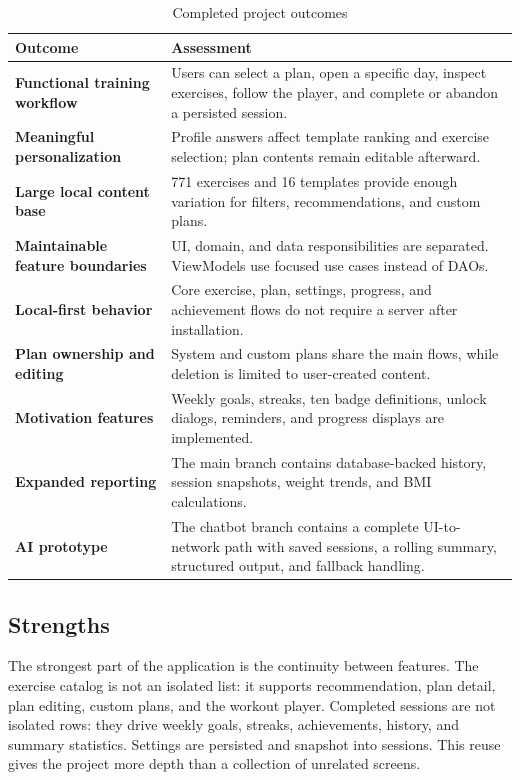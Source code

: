 \begin{table}[ht]
\centering
\caption{Completed project outcomes}
\label{tab:completed-outcomes}
\begin{tabularx}{\textwidth}{>{\bfseries}p{} X}
\toprule
Outcome & Assessment \\
\midrule
Functional training workflow & Users can select a plan, open a specific day, inspect exercises, follow the player, and complete or abandon a persisted session. \\
Meaningful personalization & Profile answers affect template ranking and exercise selection; plan contents remain editable afterward. \\
Large local content base & 771 exercises and 16 templates provide enough variation for filters, recommendations, and custom plans. \\
Maintainable feature boundaries & UI, domain, and data responsibilities are separated. ViewModels use focused use cases instead of DAOs. \\
Local-first behavior & Core exercise, plan, settings, progress, and achievement flows do not require a server after installation. \\
Plan ownership and editing & System and custom plans share the main flows, while deletion is limited to user-created content. \\
Motivation features & Weekly goals, streaks, ten badge definitions, unlock dialogs, reminders, and progress displays are implemented. \\
Expanded reporting & The main branch contains database-backed history, session snapshots, weight trends, and BMI calculations. \\
AI prototype & The chatbot branch contains a complete UI-to-network path with saved sessions, a rolling summary, structured output, and fallback handling. \\
\bottomrule
\end{tabularx}
\end{table}

\subsection{Strengths}

The strongest part of the application is the continuity between features. The exercise catalog is not an isolated list: it supports recommendation, plan detail, plan editing, custom plans, and the workout player. Completed sessions are not isolated rows: they drive weekly goals, streaks, achievements, history, and summary statistics. Settings are persisted and snapshot into sessions. This reuse gives the project more depth than a collection of unrelated screens.

